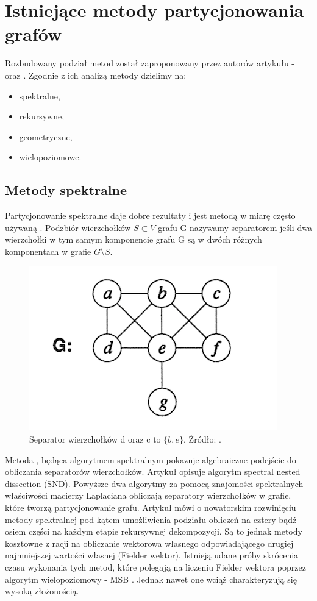 \newpage


\section{Istniejące metody partycjonowania grafów}
\label{sec:literature}

Rozbudowany podział metod został zaproponowany przez autorów artykułu - \cite{metis}
oraz \cite{1364754}.
Zgodnie z ich analizą metody dzielimy na:
\begin{itemize}
    \item spektralne,
    \item rekursywne,
    \item geometryczne,
    \item wielopoziomowe.
\end{itemize}

\subsection{Metody spektralne}
Partycjonowanie spektralne daje dobre rezultaty i jest metodą w miarę często używaną
\cite{10.1137/0611030, 10.5555/147877.147902, improved_spectral}.
Podzbiór wierzchołków \(S \subset V\) grafu G nazywamy separatorem jeśli dwa wierzchołki w tym samym komponencie
grafu G są w dwóch różnych komponentach w grafie  \(G \setminus S\).

\begin{figure}[h]
    \centering
    \includegraphics[width=0.3\linewidth]{images/separator}
    \caption{Separator wierzchołków d oraz c to \(\{b, e\}\).
    Źródło: \cite{MiTeThVa93}.}
    \label{im:separator}
\end{figure}

Metoda \cite{10.1137/0611030}, będąca algorytmem spektralnym pokazuje algebraiczne podejście do obliczania
separatorów wierzchołków.
Artykuł \cite{10.5555/147877.147902} opisuje algorytm spectral nested dissection (SND).
Powyższe dwa algorytmy za pomocą znajomości spektralnych właściwości macierzy Laplaciana obliczają separatory wierzchołków w grafie,
które tworzą partycjonowanie grafu.
Artykuł \cite{improved_spectral} mówi o nowatorskim rozwinięciu metody spektralnej pod kątem umożliwienia podziału
obliczeń na cztery bądź osiem części na każdym etapie rekursywnej dekompozycji.
Są to jednak metody kosztowne z racji na
obliczanie wektorowa własnego odpowiadającego drugiej najmniejszej wartości własnej (Fielder wektor).
Istnieją udane próby skrócenia czasu wykonania tych metod, które polegają na liczeniu Fielder wektora poprzez
algorytm wielopoziomowy - MSB \cite{fast_multilevel}.
Jednak nawet one wciąż charakteryzują się wysoką złożonością.

